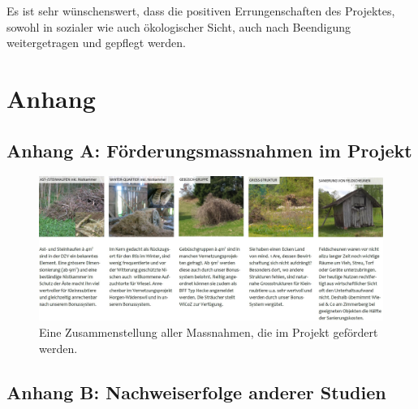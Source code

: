 \documentclass[
  oneside]{scrbook}
\begin{document}
Es ist sehr wünschenswert, dass die positiven Errungenschaften des Projektes, sowohl in sozialer wie auch ökologischer Sicht, auch nach Beendigung weitergetragen und gepflegt werden.

\hypertarget{anhang}{%
\chapter{Anhang}\label{anhang}}

\hypertarget{anhang-massnahmen}{%
\section{Anhang A: Förderungsmassnahmen im Projekt}\label{anhang-massnahmen}}



\begin{figure}[H]
\includegraphics[width=1\linewidth]{images/massnahmen} \caption{Eine Zusammenstellung aller Massnahmen, die im Projekt gefördert werden.}\label{fig:massnahmen}
\end{figure}

\hypertarget{anhang-zusammenstellung}{%
\section{Anhang B: Nachweiserfolge anderer Studien}\label{anhang-zusammenstellung}}
\end{document}
